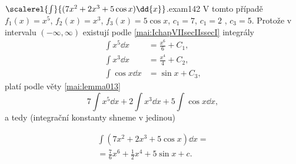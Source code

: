 \begin{mathexam}{\(\protect\scalerel{\int}{(7x^2+2x^3+5\cos x)\dd{x}}\).}{exam142}
  V tomto případě \(f_1(x) = x^5\), \(f_2(x) = x^3\), \(f_3(x) = 5\cos x\), \(c_1=7\), \(c_1=2\) ,
  \(c_3=5\). Protože v intervalu \((-\infty, \infty)\) existují podle
  \eqref{mai:IchapVIIsecIIssecI} integrály
  \begin{align*}
    \int x^5\dd{x}   &= \frac{x^6}{6} + C_1, \\
    \int x^3\dd{x}   &= \frac{x^4}{4} + C_2, \\
    \int\cos x\dd{x} &= \sin x +C_3,
  \end{align*}
  platí podle věty \eqref{mai:lemma013} \[7\int x^5\dd{x} + 2\int x^3\dd{x} + 5\int\cos x\dd{x},\]
  a tedy (integrační konstanty shneme v jedinou)
  \begin{fleqn}[0pt]
    \begin{multline*}
      \int(7x^2+2x^3+5\cos x)\dd{x} = \\
        = \frac{7}{6}x^6 + \frac{1}{2}x^4 + 5\sin x + c.
    \end{multline*}
  \end{fleqn}
\end{mathexam}